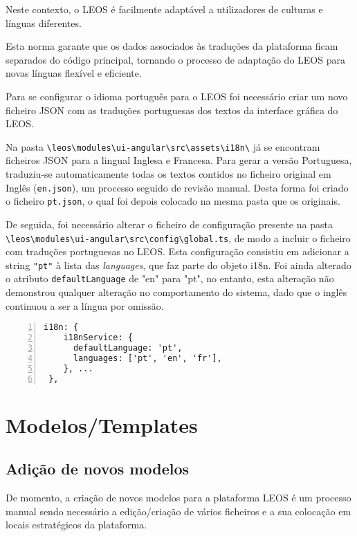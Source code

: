Neste contexto, o LEOS é facilmente adaptável a utilizadores de culturas e línguas diferentes. 

Esta norma garante que os dados associados às traduções da plataforma ficam separados do código principal, 
tornando o processo de adaptação do LEOS para novas línguas flexível e eficiente.

Para se configurar o idioma português para o LEOS foi necessário criar um novo ficheiro JSON com as traduções portuguesas dos 
textos da interface gráfica do LEOS. 

Na pasta \verb|\leos\modules\ui-angular\src\assets\i18n\| já se encontram ficheiros JSON para a lingual Inglesa e Francesa. 
Para gerar a versão Portuguesa, traduziu-se automaticamente todas os textos contidos no ficheiro original em Inglês 
(\texttt{en.json}), 
um processo seguido de revisão manual. 
Desta forma foi criado o ficheiro \texttt{pt.json}, o qual foi depois colocado na mesma pasta que os originais.

De seguida, foi necessário alterar o ficheiro de configuração presente na pasta \\
\verb|\leos\modules\ui-angular\src\config\global.ts|, de modo a incluir o ficheiro com traduções portuguesas no LEOS. 
Esta configuração consistiu em adicionar a string \texttt{"pt"} à lista das \emph{languages}, que faz parte do objeto i18n. 
Foi ainda alterado o atributo \texttt{defaultLanguage} de "en" para "pt", no entanto, esta alteração não demonstrou qualquer 
alteração no comportamento do sistema, dado que o inglês continuou a ser a língua por omissão.

\begin{Verbatim}[frame=single, numbers=left, fontsize=\scriptsize]
i18n: {
    i18nService: {
      defaultLanguage: 'pt',
      languages: ['pt', 'en', 'fr'],
    }, ... 
 },
\end{Verbatim}


\section{Modelos/Templates}

\subsection{Adição de novos modelos}

De momento, a criação de novos modelos para a plataforma LEOS é um processo manual sendo necessário a edição/criação de vários 
ficheiros e a sua colocação em locais estratégicos da plataforma.

